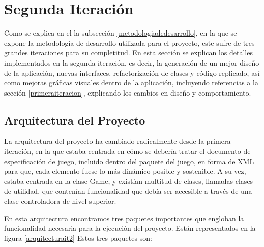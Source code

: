 \chapter{Segunda Iteración}

Como se explica en el la subsección \ref{metodologiadedesarrollo}, en la que se expone la metodología de desarrollo utilizada para el proyecto, este sufre de tres grandes iteraciones para su completitud. En esta sección se explican los detalles implementados en la segunda iteración, es decir, la generación de un mejor diseño de la aplicación, nuevas interfaces, refactorización de clases y código replicado, así como mejoras gráficas visuales dentro de la aplicación, incluyendo referencias a la sección \ref{primeraiteracion}, explicando los cambios en diseño y comportamiento.

\section{Arquitectura del Proyecto}
\label{it2arquitectura}

La arquitectura del proyecto ha cambiado radicalmente desde la primera iteración, en la que estaba centrada en cómo se debería tratar el documento de especificación de juego, incluido dentro del paquete del juego, en forma de XML para que, cada elemento fuese lo más dinámico posible y sostenible. A su vez, estaba centrada en la clase Game, y existían multitud de clases, llamadas clases de utilidad, que contenían funcionalidad que debía ser accesible a través de una clase controladora de nivel superior.

En esta arquitectura encontramos tres paquetes importantes que engloban la funcionalidad necesaria para la ejecución del proyecto. Están representados en la figura \ref{arquitecturait2} Estos tres paquetes son:


